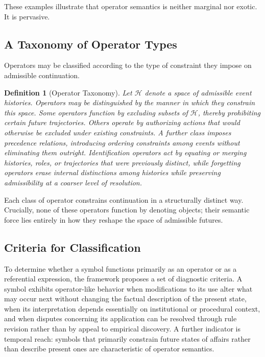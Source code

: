 \documentclass[11pt]{article}
\newtheorem{definition}{Definition}
\newcommand{\Hist}{\mathcal{H}}
\begin{document}
These examples illustrate that operator semantics is neither marginal nor exotic.
It is pervasive.

\subsection{A Taxonomy of Operator Types}

Operators may be classified according to the type of constraint they impose on
admissible continuation.

\begin{definition}[Operator Taxonomy]
Let $\Hist$ denote a space of admissible event histories. Operators may be
distinguished by the manner in which they constrain this space. Some operators
function by excluding subsets of $\Hist$, thereby prohibiting certain future
trajectories. Others operate by authorizing actions that would otherwise be
excluded under existing constraints. A further class imposes precedence
relations, introducing ordering constraints among events without eliminating
them outright. Identification operators act by equating or merging histories,
roles, or trajectories that were previously distinct, while forgetting operators
erase internal distinctions among histories while preserving admissibility at a
coarser level of resolution.
\end{definition}

Each class of operator constrains continuation in a structurally distinct way.
Crucially, none of these operators function by denoting objects; their semantic
force lies entirely in how they reshape the space of admissible futures.


\subsection{Criteria for Classification}

To determine whether a symbol functions primarily as an operator or as a
referential expression, the framework proposes a set of diagnostic criteria.
A symbol exhibits operator-like behavior when modifications to its use alter
what may occur next without changing the factual description of the present
state, when its interpretation depends essentially on institutional or
procedural context, and when disputes concerning its application can be resolved
through rule revision rather than by appeal to empirical discovery. A further
indicator is temporal reach: symbols that primarily constrain future states of
affairs rather than describe present ones are characteristic of operator
semantics.
\end{document}
